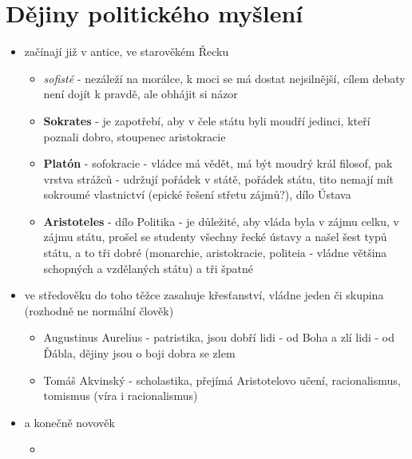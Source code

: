 \documentclass{article}
\begin{document}
\section{Dějiny politického myšlení}
\begin{itemize}
  \item začínají již v antice, ve starověkém Řecku
  \begin{itemize}
    \item \textit{sofisté} - nezáleží na morálce, k moci se má dostat nejsilnější, cílem debaty není dojít k pravdě, ale obhájit si názor
    \item \textbf{Sokrates} - je zapotřebí, aby v čele státu byli moudří jedinci, kteří poznali dobro, stoupenec aristokracie
    \item \textbf{Platón} - sofokracie - vládce má vědět, má být moudrý král filosof, pak vrstva strážců - udržují pořádek v státě, pořádek státu, tito nemají mít sokroumé vlastnictví (epické řešení střetu zájmů?), dílo Ústava
    \item \textbf{Aristoteles} - dílo Politika - je důležité, aby vláda byla v zájmu celku, v zájmu státu, prošel se studenty všechny řecké ústavy a našel šest typů státu, a to tři dobré (monarchie, aristokracie, politeia - vládne většina schopných a vzdělaných státu) a tři špatné
  \end{itemize}
  \item ve středověku do toho těžce zasahuje křesťanství, vládne jeden či skupina (rozhodně ne normální člověk)
  \begin{itemize}
    \item Augustinus Aurelius - patristika, jsou dobří lidi - od Boha a zlí lidi - od Ďábla, dějiny jsou o boji dobra se zlem
    \item Tomáš Akvinský - scholastika, přejímá Aristotelovo učení, racionalismus, tomismus (víra i racionalismus)
  \end{itemize}
  \item a konečně novověk
  \begin{itemize}
    \item
  \end{itemize}
\end{itemize}
\end{document}
